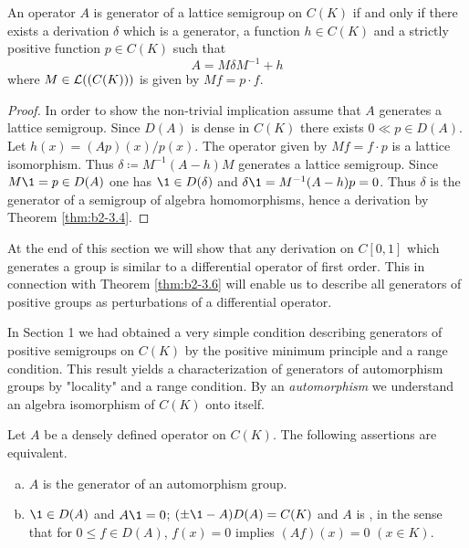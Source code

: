 \begin{theorem}\label{thm:b2-3.6}
An operator $A$ is generator of a lattice semigroup on $C(K)$ if and only if there exists a derivation $\delta$ which is a generator, a function $h \in C(K)$ and a strictly positive function $p \in C(K)$ such that
\begin{equation} \label{eq:b2-3.7}
A = M\delta M^{-1} + h
\end{equation}
where $M \in \mathcal{L}((C(K)))$ is given by $Mf = p \cdot f$.
\end{theorem}

\begin{proof}
In order to show the non-trivial implication assume that $A$ generates a lattice semigroup.
Since $D(A)$ is dense in $C(K)$ there exists $0 \ll p \in D(A)$.
Let $h(x) = (Ap)(x)/p(x)$.
The operator given by $Mf = f \cdot p$ is a lattice isomorphism.
Thus $\delta \coloneqq M^{-1}(A - h)M$ generates a lattice semigroup.
Since $M\1 = p \in D(A)$ one has $\1 \in D(\delta)$ and $\delta\1 = M^{-1}(A - h)p = 0$.
Thus $\delta$ is the generator of a semigroup of algebra homomorphisms, hence a derivation by Theorem \ref{thm:b2-3.4}.
\end{proof}

At the end of this section we will show that any derivation on $C[0,1]$ which generates a group is similar to a differential operator of first order.
This in connection with Theorem \ref{thm:b2-3.6} will enable us to describe all generators of positive groups as perturbations of a differential operator.

In Section 1 we had obtained a very simple condition describing generators of positive semigroups on $C(K)$ by the positive minimum principle and a range condition.
This result yields a characterization of generators of automorphism groups by "locality" and a range condition.
By an \emph{automorphism} we understand an algebra isomorphism of $C(K)$ onto itself.
\begin{theorem}\label{thm:b2-3.7}
Let $A$ be a densely defined operator on $C(K)$.
The following assertions are equivalent.
\begin{enumerate}[(a)]
\item \label{thm:b2-3.7-1}
$A$ is the generator of an automorphism group.
\item \label{thm:b2-3.7-2}
$\1 \in D(A)$ and $A\1 = 0$; $(\pm \1 - A)D(A) = C(K)$ and $A$ is , in the sense that for $0 \leq f \in D(A)$, $f(x) = 0$ implies $(Af)(x) = 0$ $(x \in K)$.
\end{enumerate}
\end{theorem}

